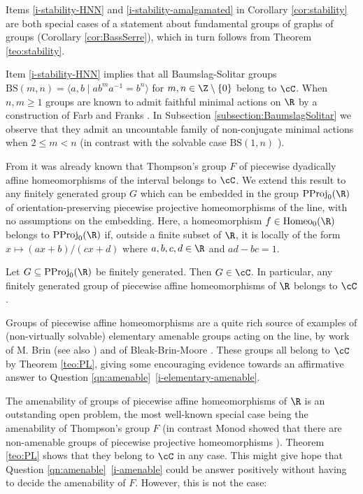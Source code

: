 \documentclass[reqno]{amsart}
\begin{document}
Items \eqref{i-stability-HNN} 
and \eqref{i-stability-amalgamated} in Corollary \ref{cor:stability} are both special cases of a statement about fundamental groups of graphs of groups (Corollary \ref{cor:BassSerre}), which in turn follows from Theorem \ref{teo:stability}.

\begin{ejm}
Item \eqref{i-stability-HNN} implies that all Baumslag-Solitar groups $\mathrm{BS}(m,n) = \langle a,b \mid ab^m a^{-1} = b^n \rangle$ for $m,n \in \Z \setminus \{0\}$ belong to $\cC$. When $n, m \ge 1$ groups are known to admit faithful minimal actions on $\R$ by a construction of Farb and Franks \cite{FarbFranks2020}.  In  Subsection \ref{subsection:BaumslagSolitar} we observe that they admit an uncountable family of non-conjugate minimal actions when $2 \leq m <n$ (in contrast with the solvable case $\mathrm{BS}(1, n)$ \cite{Rivas2010}).
\end{ejm}




From \cite[Section 16.3.1]{BMRT} it was already known that Thompson's group $F$ of piecewise dyadically affine homeomorphisms of the interval belongs to $\cC$. We extend this result to any finitely generated group $G$ which can be embedded in the group $\mathrm{PProj}_0(\R)$ of orientation-preserving piecewise projective homeomorphisms of the line, with no assumptions on the embedding. Here, a homeomorphism $f \in \mathrm{Homeo}_0(\R)$ belongs to $\mathrm{PProj}_0(\R)$ if, outside a finite subset of $\R$, it is locally of the form $x \mapsto (ax + b)/(cx + d)$ where $a,b,c,d \in \R$ and $ad - bc = 1$.

\begin{thmA} \label{teo:PL}
	Let $G \subseteq \mathrm{PProj}_0(\R)$ be finitely generated. Then $G \in \cC$. In particular, any finitely generated group of piecewise affine homeomorphisms of $\R$ belongs to $\cC$.
\end{thmA}


Groups of piecewise affine homeomorphisms are a quite rich source of examples of (non-virtually solvable) elementary amenable groups acting on the line, by work of M. Brin \cite{Brin2005} (see also \cite{Navas2004}) and of Bleak-Brin-Moore \cite{BleakBrinMoore2021}. These groups all belong to $\cC$ by Theorem \ref{teo:PL}, giving some encouraging evidence towards an affirmative answer to Question \ref{qn:amenable}~\eqref{i-elementary-amenable}. 

The amenability of groups of piecewise affine homeomorphisms of $\R$ is an outstanding open problem, the most well-known special case being the amenability of Thompson's group $F$ (in contrast Monod showed that there are non-amenable groups of piecewise projective homeomorphisms \cite{Monod2013}). Theorem \ref{teo:PL} shows that they belong to $\cC$ in any case. This might give hope that Question \ref{qn:amenable}~\eqref{i-amenable} could be answer positively without having to decide the amenability of $F$. However, this is not the case:
\end{document}
